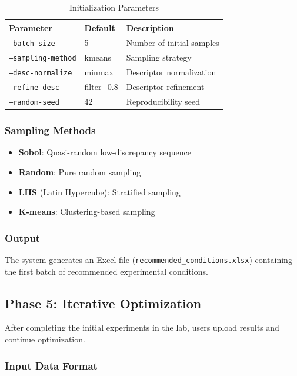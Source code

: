 \documentclass[12pt,a4paper]{article}
\begin{document}
\begin{table}[h]
\centering
\caption{Initialization Parameters}
\begin{tabular}{lll}
\toprule
\textbf{Parameter} & \textbf{Default} & \textbf{Description} \\
\midrule
\texttt{--batch-size} & 5 & Number of initial samples \\
\texttt{--sampling-method} & kmeans & Sampling strategy \\
\texttt{--desc-normalize} & minmax & Descriptor normalization \\
\texttt{--refine-desc} & filter\_0.8 & Descriptor refinement \\
\texttt{--random-seed} & 42 & Reproducibility seed \\
\bottomrule
\end{tabular}
\end{table}

\subsubsection{Sampling Methods}

\begin{itemize}
    \item \textbf{Sobol}: Quasi-random low-discrepancy sequence
    \item \textbf{Random}: Pure random sampling
    \item \textbf{LHS} (Latin Hypercube): Stratified sampling
    \item \textbf{K-means}: Clustering-based sampling
\end{itemize}

\subsubsection{Output}

The system generates an Excel file (\texttt{recommended\_conditions.xlsx}) containing the first batch of recommended experimental conditions.

\subsection{Phase 5: Iterative Optimization}

After completing the initial experiments in the lab, users upload results and continue optimization.

\subsubsection{Input Data Format}
\end{document}
